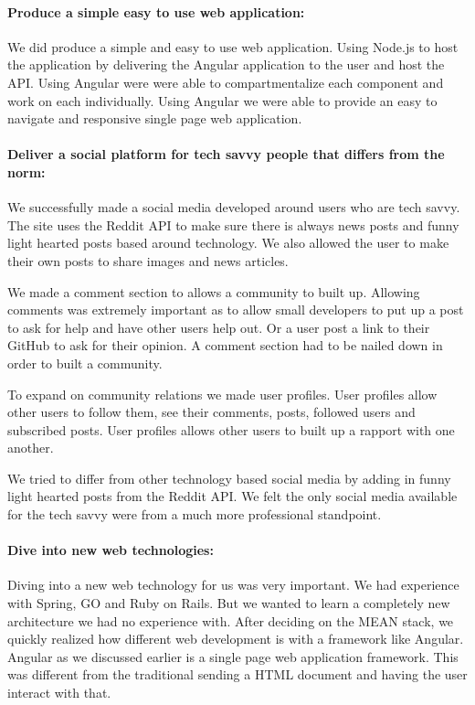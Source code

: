 \paragraph{Produce a simple easy to use web application:}
We did produce a simple and easy to use web application. Using Node.js to host the application by delivering the Angular application to the user and host the API. Using Angular were were able to compartmentalize each component and work on each individually. Using Angular we were able to provide an easy to navigate and responsive single page web application.

\paragraph{Deliver  a  social  platform  for  tech  savvy  people  that  differs  from  the norm:}
We successfully made a social media developed around users who are tech savvy. The site uses the Reddit API to make sure there is always news posts and funny light hearted posts based around technology. We also allowed the user to make their own posts to share images and news articles.

We made a comment section to allows a community to built up. Allowing comments was extremely important as to allow small developers to put up a post to ask for help and have other users help out. Or a user post a link to their GitHub to ask for their opinion. A comment section had to be nailed down in order to built a community.

To expand on community relations we made user profiles. User profiles allow other users to follow them, see their comments, posts, followed users and subscribed posts. User profiles allows other users to built up a rapport with one another.

We tried to differ from other technology based social media by adding in funny light hearted posts from the Reddit API. We felt the only social media available for the tech savvy were from a much more professional standpoint.

\paragraph{Dive into new web technologies:}
Diving into a new web technology for us was very important. We had experience with Spring, GO and Ruby on  Rails. But we wanted to learn a completely new architecture we had no experience with. After deciding on the MEAN stack, we quickly realized how different web development is with a framework like Angular. Angular as we discussed earlier is a single page web application framework. This was different from the traditional sending a HTML document and having the user interact with that. 

